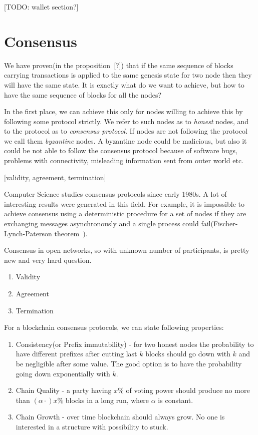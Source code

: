 \documentclass[]{report}   %
\begin{document}
[TODO: wallet section?]

\section{Consensus}

We have proven(in the proposition~[?]) that if the same sequence of blocks carrying transactions is applied to the same genesis state for two node then they will have the same state. It is exactly what do we want to achieve, but how to have the same sequence of blocks for all the nodes? 

In the first place, we can achieve this only for nodes willing to achieve this by following some protocol strictly. We refer to such nodes as to \textit{honest} nodes, and to the protocol as to \textit{consensus protocol}. If nodes are not following the protocol we call them \textit{byzantine} nodes. A byzantine node could be malicious, but also it could be not able to follow the consensus protocol because of software bugs, problems with connectivity, misleading information sent from outer world etc. 

[validity, agreement, termination]

Computer Science studies consensus protocols since early 1980s. A lot of interesting results were generated in this field. For example, it is impossible to achieve consensus using a deterministic procedure for a set of nodes if they are exchanging messages asynchronously and a single process could fail(Fischer-Lynch-Paterson theorem~\cite{fischer1985impossibility}). 

Consensus in open networks, so with unknown number of participants, is pretty new and very hard question. 

\begin{enumerate}
\item{Validity}
\item{Agreement}
\item{Termination}
\end{enumerate}

For a blockchain consensus protocols, we can state following properties:

\begin{enumerate}
\item{Consistency(or Prefix immutability)} - for two honest nodes the probability to have different prefixes after cutting last \(k\) blocks should go down with \(k\) and be negligible after some value. The good option is to have the probability going down exponentially with \(k\).
\item{Chain Quality} - a party having \(x\%\) of voting power should produce no more than \((\alpha \cdot) x \%\) blocks in a long run, where \(\alpha\) is constant.
\item{Chain Growth} - over time blockchain should always grow. No one is interested in a structure with possibility to stuck. 
\end{enumerate}
\end{document}
